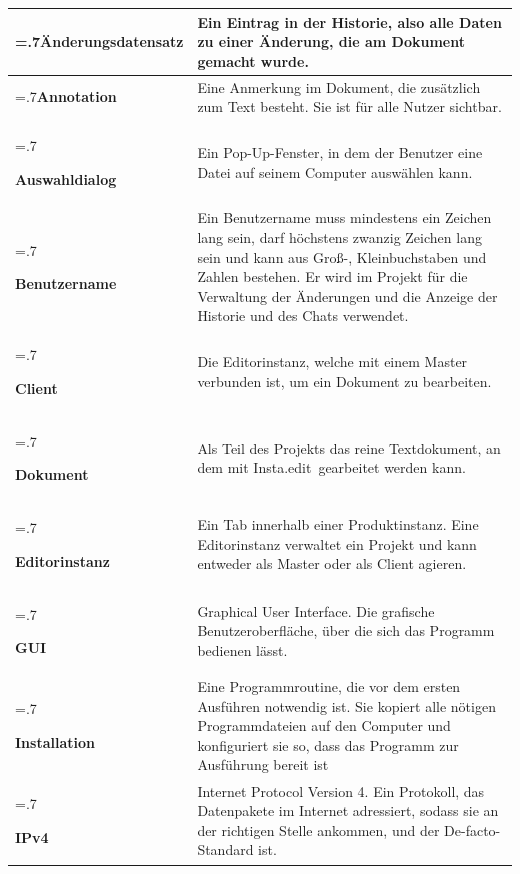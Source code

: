 \documentclass{scrartcl}
\newcommand{\name}{Insta.edit}
\begin{document}
  \begin{tabularx}{\linewidth}{
    >{\hsize=.7\hsize}X|%
    >{\hsize=1.3\hsize}X%
  }

\hline
\textbf{Änderungsdatensatz} & Ein Eintrag in der Historie, also alle Daten zu einer Änderung, die am Dokument gemacht wurde. \\ \hline

\textbf{Annotation} & Eine Anmerkung im Dokument, die zusätzlich zum Text besteht. Sie ist für alle Nutzer sichtbar. \\ \hline

\textbf{Auswahldialog} & Ein Pop-Up-Fenster, in dem der Benutzer eine Datei auf seinem Computer auswählen kann. \\ \hline

\textbf{Benutzername} & Ein Benutzername muss mindestens ein Zeichen lang sein, darf höchstens zwanzig Zeichen lang sein und kann aus Groß-, Kleinbuchstaben und Zahlen bestehen. Er wird im Projekt für die Verwaltung der Änderungen und die Anzeige der Historie und des Chats verwendet. \\ \hline

\textbf{Client} & Die Editorinstanz, welche mit einem Master verbunden ist, um ein Dokument zu bearbeiten. \\ \hline

\textbf{Dokument} & Als Teil des Projekts das reine Textdokument, an dem mit \name\ gearbeitet werden kann. \\ \hline

\textbf{Editorinstanz} & Ein Tab innerhalb einer Produktinstanz. Eine Editorinstanz verwaltet ein Projekt und kann entweder als Master oder als Client agieren. \\ \hline

\textbf{GUI}  & Graphical User Interface. Die grafische Benutzeroberfläche, über die sich das Programm bedienen lässt. \\ \hline

\textbf{Installation} & Eine Programmroutine, die vor dem ersten Ausführen notwendig ist. Sie kopiert alle nötigen Programmdateien auf den Computer und konfiguriert sie so, dass das Programm zur Ausführung bereit ist \\ \hline

\textbf{IPv4} & Internet Protocol Version 4. Ein Protokoll, das Datenpakete im Internet adressiert, sodass sie an der richtigen Stelle ankommen, und der De-facto-Standard ist. \\ \hline


\end{tabularx}
\end{document}

